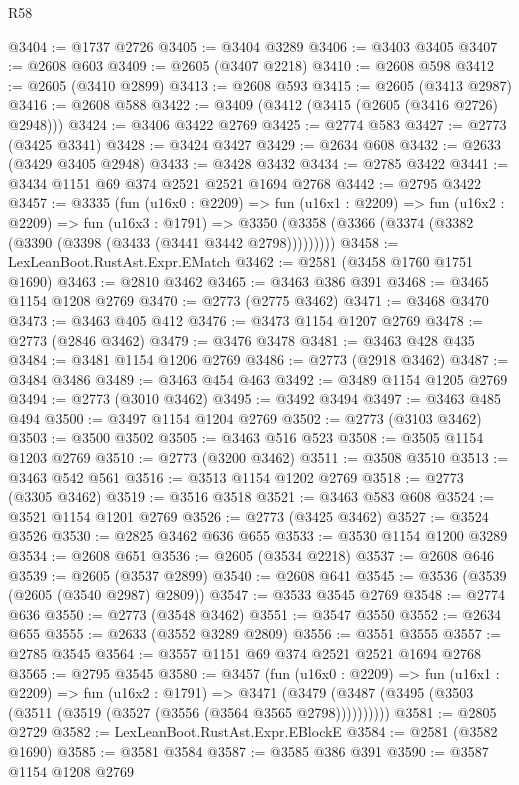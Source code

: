 \begin{lexlean}{R58}
\begin{coremodule}
@3404 := @1737 @2726
@3405 := @3404 @3289
@3406 := @3403 @3405
@3407 := @2608 @603
@3409 := @2605 (@3407 @2218)
@3410 := @2608 @598
@3412 := @2605 (@3410 @2899)
@3413 := @2608 @593
@3415 := @2605 (@3413 @2987)
@3416 := @2608 @588
@3422 := @3409 (@3412 (@3415 (@2605 (@3416 @2726) @2948)))
@3424 := @3406 @3422 @2769
@3425 := @2774 @583
@3427 := @2773 (@3425 @3341)
@3428 := @3424 @3427
@3429 := @2634 @608
@3432 := @2633 (@3429 @3405 @2948)
@3433 := @3428 @3432
@3434 := @2785 @3422
@3441 := @3434 @1151 @69 @374 @2521 @2521 @1694 @2768
@3442 := @2795 @3422
@3457 := @3335
    (fun (u16x0 : @2209) =>
    fun (u16x1 : @2209) =>
    fun (u16x2 : @2209) =>
    fun (u16x3 : @1791) =>
    @3350 (@3358 (@3366 (@3374 (@3382 (@3390 (@3398 (@3433 (@3441 @3442 @2798)))))))))
@3458 := LexLeanBoot.RustAst.Expr.EMatch
@3462 := @2581 (@3458 @1760 @1751 @1690)
@3463 := @2810 @3462
@3465 := @3463 @386 @391
@3468 := @3465 @1154 @1208 @2769
@3470 := @2773 (@2775 @3462)
@3471 := @3468 @3470
@3473 := @3463 @405 @412
@3476 := @3473 @1154 @1207 @2769
@3478 := @2773 (@2846 @3462)
@3479 := @3476 @3478
@3481 := @3463 @428 @435
@3484 := @3481 @1154 @1206 @2769
@3486 := @2773 (@2918 @3462)
@3487 := @3484 @3486
@3489 := @3463 @454 @463
@3492 := @3489 @1154 @1205 @2769
@3494 := @2773 (@3010 @3462)
@3495 := @3492 @3494
@3497 := @3463 @485 @494
@3500 := @3497 @1154 @1204 @2769
@3502 := @2773 (@3103 @3462)
@3503 := @3500 @3502
@3505 := @3463 @516 @523
@3508 := @3505 @1154 @1203 @2769
@3510 := @2773 (@3200 @3462)
@3511 := @3508 @3510
@3513 := @3463 @542 @561
@3516 := @3513 @1154 @1202 @2769
@3518 := @2773 (@3305 @3462)
@3519 := @3516 @3518
@3521 := @3463 @583 @608
@3524 := @3521 @1154 @1201 @2769
@3526 := @2773 (@3425 @3462)
@3527 := @3524 @3526
@3530 := @2825 @3462 @636 @655
@3533 := @3530 @1154 @1200 @3289
@3534 := @2608 @651
@3536 := @2605 (@3534 @2218)
@3537 := @2608 @646
@3539 := @2605 (@3537 @2899)
@3540 := @2608 @641
@3545 := @3536 (@3539 (@2605 (@3540 @2987) @2809))
@3547 := @3533 @3545 @2769
@3548 := @2774 @636
@3550 := @2773 (@3548 @3462)
@3551 := @3547 @3550
@3552 := @2634 @655
@3555 := @2633 (@3552 @3289 @2809)
@3556 := @3551 @3555
@3557 := @2785 @3545
@3564 := @3557 @1151 @69 @374 @2521 @2521 @1694 @2768
@3565 := @2795 @3545
@3580 := @3457
    (fun (u16x0 : @2209) =>
    fun (u16x1 : @2209) =>
    fun (u16x2 : @1791) =>
    @3471 (@3479 (@3487 (@3495 (@3503 (@3511 (@3519 (@3527 (@3556 (@3564 @3565 @2798))))))))))
@3581 := @2805 @2729
@3582 := LexLeanBoot.RustAst.Expr.EBlockE
@3584 := @2581 (@3582 @1690)
@3585 := @3581 @3584
@3587 := @3585 @386 @391
@3590 := @3587 @1154 @1208 @2769

\end{coremodule}
\end{lexlean}

